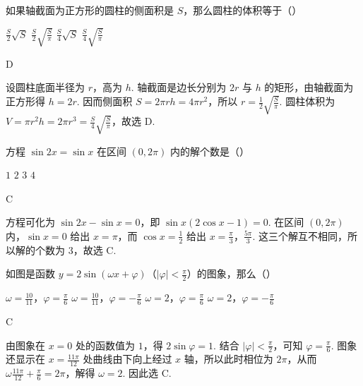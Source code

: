 \begin{problem}
如果轴截面为正方形的圆柱的侧面积是 \(S\)，那么圆柱的体积等于（\quad）

\choices
    {\(\frac{S}{2}\sqrt{S}\)}
    {\(\frac{S}{2}\sqrt{\frac{S}{\pi}}\)}
    {\(\frac{S}{4}\sqrt{S}\)}
    {\(\frac{S}{4}\sqrt{\frac{S}{\pi}}\)}

\begin{answer}
D
\end{answer}

\begin{solution}
设圆柱底面半径为 \(r\)，高为 \(h\). 轴截面是边长分别为 \(2r\) 与 \(h\) 的矩形，由轴截面为正方形得 \(h=2r\). 因而侧面积 \(S=2\pi rh=4\pi r^2\)，所以 \(r=\frac{1}{2}\sqrt{\frac{S}{\pi}}\). 圆柱体积为 \(V=\pi r^2h=2\pi r^3=\frac{S}{4}\sqrt{\frac{S}{\pi}}\)，故选 D.
\end{solution}
\end{problem}

\begin{problem}
方程 \(\sin 2x=\sin x\) 在区间 \((0,2\pi)\) 内的解个数是（\quad）

\choices
    {\(1\)}
    {\(2\)}
    {\(3\)}
    {\(4\)}

\begin{answer}
C
\end{answer}

\begin{solution}
方程可化为 \(\sin 2x-\sin x=0\)，即 \(\sin x(2\cos x-1)=0\). 在区间 \((0,2\pi)\) 内，\(\sin x=0\) 给出 \(x=\pi\)，而 \(\cos x=\frac{1}{2}\) 给出 \(x=\frac{\pi}{3}\)，\(\frac{5\pi}{3}\). 这三个解互不相同，所以解的个数为 \(3\)，故选 C.
\end{solution}
\end{problem}

\begin{problem}
如图是函数 \(y=2\sin\left( \omega x+\varphi \right)\)（\(\left| \varphi \right|<\frac{\pi}{2}\)）的图象，那么（\quad）


\choices
    {\(\omega=\frac{10}{11}\)，\(\varphi=\frac{\pi}{6}\)}
    {\(\omega=\frac{10}{11}\)，\(\varphi=-\frac{\pi}{6}\)}
    {\(\omega=2\)，\(\varphi=\frac{\pi}{6}\)}
    {\(\omega=2\)，\(\varphi=-\frac{\pi}{6}\)}

\begin{answer}
C
\end{answer}

\begin{solution}
由图象在 \(x=0\) 处的函数值为 \(1\)，得 \(2\sin\varphi=1\). 结合 \(\lvert\varphi\rvert<\frac{\pi}{2}\)，可知 \(\varphi=\frac{\pi}{6}\). 图象还显示在 \(x=\frac{11\pi}{12}\) 处曲线由下向上经过 \(x\) 轴，所以此时相位为 \(2\pi\)，从而 \(\omega\frac{11\pi}{12}+\frac{\pi}{6}=2\pi\)，解得 \(\omega=2\). 因此选 C.
\end{solution}
\end{problem}

